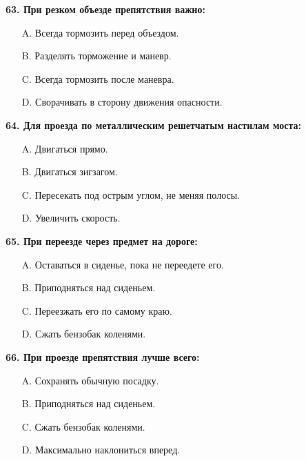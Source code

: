 \begin{minipage}{\linewidth}
\vspace{1em}\noindent\textbf{63. При резком объезде препятствия важно:}

\begin{itemize}[nosep,leftmargin=2em]
\item [A.] Всегда тормозить перед объездом.
\item [B.] Разделять торможение и маневр.
\item [C.] Всегда тормозить после маневра.
\item [D.] Сворачивать в сторону движения опасности.

\end{itemize}
\end{minipage}


\begin{minipage}{\linewidth}
\vspace{1em}\noindent\textbf{64. Для проезда по металлическим решетчатым настилам моста:}

\begin{itemize}[nosep,leftmargin=2em]
\item [A.] Двигаться прямо.
\item [B.] Двигаться зигзагом.
\item [C.] Пересекать под острым углом, не меняя полосы.
\item [D.] Увеличить скорость.

\end{itemize}
\end{minipage}


\begin{minipage}{\linewidth}
\vspace{1em}\noindent\textbf{65. При переезде через предмет на дороге:}

\begin{itemize}[nosep,leftmargin=2em]
\item [A.] Оставаться в сиденье, пока не переедете его.
\item [B.] Приподняться над сиденьем.
\item [C.] Переезжать его по самому краю.
\item [D.] Сжать бензобак коленями.

\end{itemize}
\end{minipage}


\begin{minipage}{\linewidth}
\vspace{1em}\noindent\textbf{66. При проезде препятствия лучше всего:}

\begin{itemize}[nosep,leftmargin=2em]
\item [A.] Сохранять обычную посадку.
\item [B.] Приподняться над сиденьем.
\item [C.] Сжать бензобак коленями.
\item [D.] Максимально наклониться вперед.

\end{itemize}
\end{minipage}


